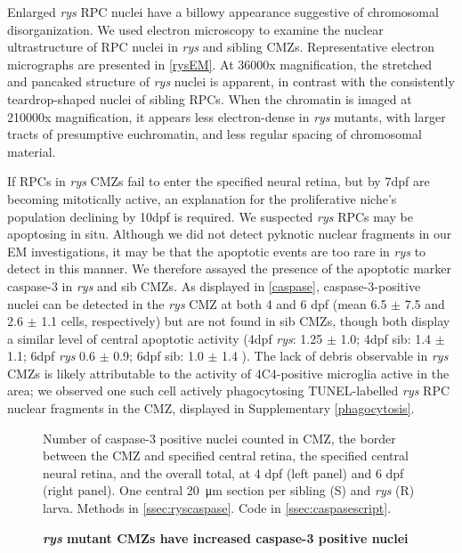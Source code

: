 Enlarged \textit{rys} RPC nuclei have a billowy appearance suggestive of chromosomal disorganization. We used electron microscopy to examine the nuclear ultrastructure of RPC nuclei in \textit{rys} and sibling CMZs. Representative electron micrographs are presented in \autoref{rysEM}. At 36000x magnification, the stretched and pancaked structure of \textit{rys} nuclei is apparent, in contrast with the consistently teardrop-shaped nuclei of sibling RPCs. When the chromatin is imaged at 210000x magnification, it appears less electron-dense in \textit{rys} mutants, with larger tracts of presumptive euchromatin, and less regular spacing of chromosomal material.
\FloatBarrier

If RPCs in \textit{rys} CMZs fail to enter the specified neural retina, but by 7dpf are becoming mitotically active, an explanation for the proliferative niche's population declining by 10dpf is required. We suspected \textit{rys} RPCs may be apoptosing in situ. Although we did not detect pyknotic nuclear fragments in our EM investigations, it may be that the apoptotic events are too rare in \textit{rys} to detect in this manner. We therefore assayed the presence of the apoptotic marker caspase-3 in \textit{rys} and sib CMZs. As displayed in \autoref{caspase}, caspase-3-positive nuclei can be detected in the \textit{rys} CMZ at both 4 and 6 dpf (mean 6.5 $\pm$ 7.5 and 2.6 $\pm$ 1.1 cells, respectively) but are not found in sib CMZs, though both display a similar level of central apoptotic activity (4dpf \textit{rys}: 1.25 $\pm$ 1.0; 4dpf sib: 1.4 $\pm$ 1.1; 6dpf \textit{rys} 0.6 $\pm$ 0.9; 6dpf sib: 1.0 $\pm$ 1.4 ). The lack of debris observable in \textit{rys} CMZs is likely attributable to the activity of 4C4-positive microglia active in the area; we observed one such cell actively phagocytosing TUNEL-labelled \textit{rys} RPC nuclear fragments in the CMZ, displayed in Supplementary \autoref{phagocytosis}.

\begin{figure}[!h]
    \caption{{\bf \textit{rys} mutant CMZs have increased caspase-3 positive nuclei}}
    Number of caspase-3 positive nuclei counted in CMZ, the border between the CMZ and specified central retina, the specified central neural retina, and the overall total, at 4 dpf (left panel) and 6 dpf (right panel). One central \SI{20}{\micro\metre} section per sibling (S) and \textit{rys} (R) larva.
    \label{caspase}
    Methods in \autoref{ssec:ryscaspase}.
    Code in \autoref{ssec:caspasescript}.
\end{figure}

